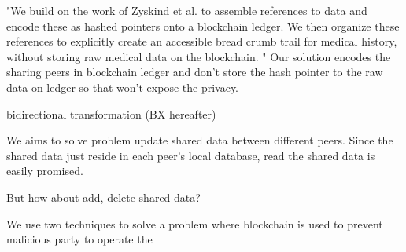 \documentclass[conference]{IEEEtran}
\begin{document}
"We build on the work of Zyskind et al. \cite{zyskind2015decentralizing} to assemble references to data and encode these as hashed pointers onto a blockchain ledger. We then organize these references to explicitly create an accessible bread crumb trail for medical history, without storing raw medical data on the blockchain. " Our solution encodes the sharing peers in blockchain ledger and don't store the hash pointer to the raw data on ledger so that won't expose the privacy.

bidirectional transformation (BX hereafter)

We aims to solve problem update shared data between different peers. Since the shared data just reside in each peer's local database, read the shared data is easily promised.

But how about add, delete shared data?

We use two techniques to  solve a problem where blockchain is used to prevent malicious party to operate the 




%
%
%
%
%
\end{document}
